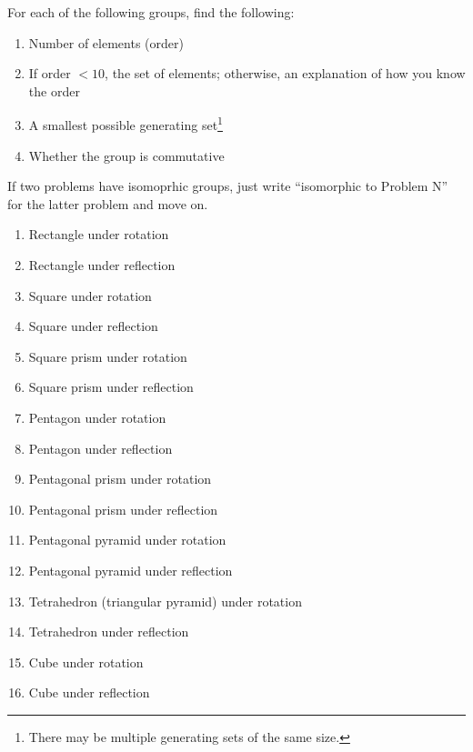 \documentclass[../gatm.tex]{subfiles}
\begin{document}
For each of the following groups, find the following:

\begin{enumerate}[label=(\alph*)]
\item Number of elements (order)
\item If order $< 10$, the set of elements; otherwise, an explanation of how you know the order
\item A smallest possible generating set\footnote{There may be multiple generating sets of the same size.}
\item Whether the group is commutative
\end{enumerate}

If two problems have isomoprhic groups, just write ``isomorphic to Problem N'' for the latter problem and move on.

\begin{multicols}{2}
\begin{enumerate}
\setcounter{enumi}{\value{rrg_problem_i}}
\item Rectangle under rotation
\item Rectangle under reflection
\item Square under rotation
\item Square under reflection
\item Square prism under rotation
\item Square prism under reflection
\item Pentagon under rotation
\item Pentagon under reflection
\item Pentagonal prism under rotation
\item Pentagonal prism under reflection
\item Pentagonal pyramid under rotation
\item Pentagonal pyramid under reflection
\item Tetrahedron (triangular pyramid) under rotation
\item Tetrahedron under reflection
\item Cube under rotation
\item Cube under reflection
\end{enumerate}
\end{multicols}
\end{document}

